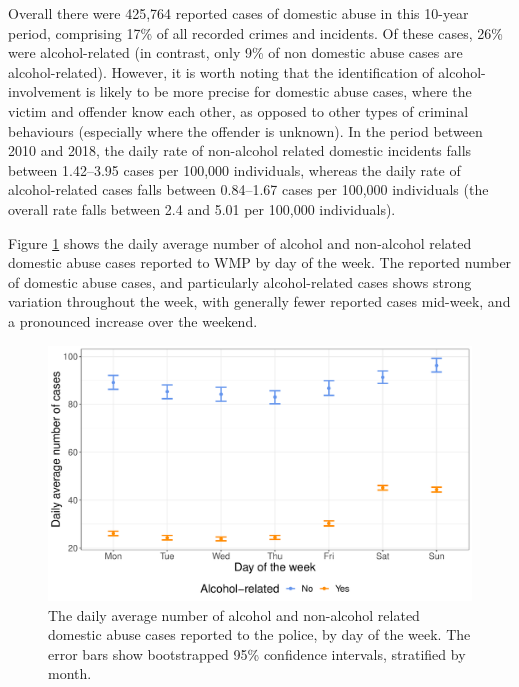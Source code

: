 \documentclass[12pt, a4paper]{article}
\newcommand{\TM}[1]{\textcolor{blue}{TM: #1}}
\begin{document}

 Overall there were 425,764 reported cases of domestic abuse in this 10-year period, comprising 17\% of all recorded crimes and incidents. Of these cases, 26\% were alcohol-related (in contrast, only 9\% of non domestic abuse cases are alcohol-related). However, it is worth noting that the identification of alcohol-involvement is likely to be more precise for domestic abuse cases, where the victim and offender know each other, as opposed to other types of criminal behaviours (especially where the offender is unknown). In the period between 2010 and 2018, the daily rate of non-alcohol related domestic incidents falls between 1.42--3.95 cases per 100,000 individuals, whereas the daily rate of alcohol-related cases falls between 0.84--1.67 cases per 100,000 individuals (the overall rate falls between 2.4 and 5.01 per 100,000 individuals). 

Figure \ref{fig:descriptive} shows the daily average number of alcohol and non-alcohol related domestic abuse cases reported to WMP by day of the week. The reported number of domestic abuse cases, and particularly alcohol-related cases shows strong variation throughout the week, with generally fewer reported cases mid-week, and a pronounced increase over the weekend. 

\begin{figure} 
\begin{center} 
\includegraphics[scale = 0.6]{descriptives.pdf}
\caption{The daily average number of alcohol and non-alcohol related domestic abuse cases reported to the police, by day of the week. The error bars show bootstrapped 95\% confidence intervals, stratified by month. \label{fig:descriptive}} 
\end{center} 
\end{figure} 
\end{document}
